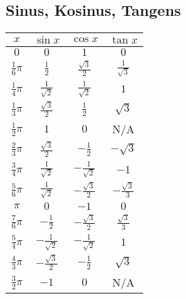 \documentclass[landscape, 10pt]{article}
\begin{document}
\begin{multicols}{3}
\subsection{Sinus, Kosinus, Tangens}
\begin{center}
\begin{tabular}{|c|c|c|c|}
       \hline
              $x$
              & $\sin x$ 
              & $\cos x$
              & $\tan x$ \\
       \hline
              $0$
              & $0$
              & $1$
              & $0$\\
       \hline
              $\frac{1}{6}\pi$
              & $\frac{1}{2}$
              & $\frac{\sqrt{3}}{2}$
              & $\frac{1}{\sqrt{3}}$\\
       \hline 
              $\frac{1}{4}\pi$ 
              & $\frac{1}{\sqrt{2}}$
              & $\frac{1}{\sqrt{2}}$
              & $1$ \\
       \hline 
              $\frac{1}{3}\pi$
              & $\frac{\sqrt{3}}{2}$
              & $\frac{1}{2}$
              & $\sqrt{3}$ \\
       \hline 
              $\frac{1}{2}\pi$
              & $1$
              & $0$
              & N/A \\
       \hline 
              $\frac{2}{3}\pi$
              & $\frac{\sqrt{3}}{2}$
              & $-\frac{1}{2}$
              & $-\sqrt{3}$ \\
       \hline 
              $\frac{3}{4}\pi$
              & $\frac{1}{\sqrt{2}}$
              & $-\frac{1}{\sqrt{2}}$
              & $-1$ \\
       \hline 
              $\frac{5}{6}\pi$
              & $\frac{1}{\sqrt{2}}$
              & $-\frac{\sqrt{3}}{2}$
              & $-\frac{\sqrt{3}}{3}$ \\
       \hline 
              $\pi$
              & $0$
              & $-1$
              & $0$\\
       \hline 
              $\frac{7}{6}\pi$
              & $-\frac{1}{2}$
              & $-\frac{\sqrt{3}}{2}$ 
              & $\frac{\sqrt{3}}{3}$\\
       \hline 
              $\frac{5}{4}\pi$ 
              & $-\frac{1}{\sqrt{2}}$
              & $-\frac{1}{\sqrt{2}}$
              & $1$ \\
       \hline 
              $\frac{4}{3}\pi$
              & $-\frac{\sqrt{3}}{2}$
              & $-\frac{1}{2}$
              & $\sqrt{3}$ \\
       \hline 
              $\frac{3}{2}\pi$
              & $-1$
              & $0$
              & N/A \\
       \hline 
\end{tabular}
\end{center}

\end{multicols}
\end{document}
